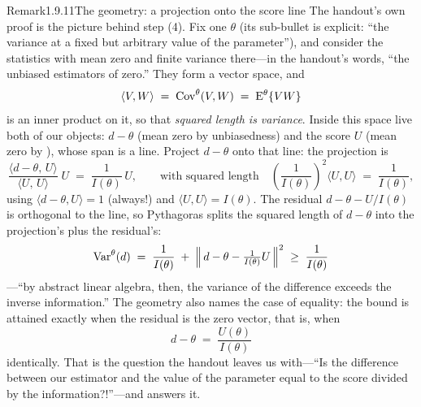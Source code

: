 \documentclass[main.tex]{subfiles}
\begin{document}
\begin{ObjL}{Remark}{1.9.11}{The geometry: a projection onto the score line}
The handout's own proof is the picture behind step (4). Fix one $\theta$ (its sub-bullet is
explicit: ``the variance at a fixed but arbitrary value of the parameter''), and consider the
statistics with mean zero and finite variance there---in the handout's words, ``the unbiased
estimators of zero.'' They form a vector space, and
\[ \langle V, W\rangle \;=\; \operatorname{Cov}^{\theta}(V,W)\;=\;\mathrm{E}^{\theta}\{VW\} \]
is an inner product on it, so that \emph{squared length is variance}. Inside this space live
both of our objects: $d-\theta$ (mean zero by unbiasedness) and the score $U$ (mean zero by
), whose span is a line. Project $d-\theta$ onto that line: the projection is
\[ \frac{\langle d-\theta,\,U\rangle}{\langle U,\,U\rangle}\; U
   \;=\; \frac{1}{I(\theta)}\,U , \qquad\text{with squared length}\quad
   \left(\frac{1}{I(\theta)}\right)^{\!2} \langle U,U\rangle \;=\; \frac{1}{I(\theta)} , \]
using $\langle d-\theta,U\rangle=1$ (always!) and $\langle U,U\rangle=I(\theta)$. The
residual $d-\theta-U/I(\theta)$ is orthogonal to the line, so Pythagoras splits the squared
length of $d-\theta$ into the projection's plus the residual's:
\[ \operatorname{Var}^{\theta}(d) \;=\; \frac{1}{I(\theta)} \;+\;
   \Big\| \,d-\theta-\tfrac{1}{I(\theta)}U\, \Big\|^2 \;\ge\; \frac{1}{I(\theta)} \]
---``by abstract linear algebra, then, the variance of the difference exceeds the inverse
information.'' The geometry also names the case of equality: the bound is attained exactly
when the residual is the zero vector, that is, when
\[ d - \theta \;=\; \frac{U(\theta)}{I(\theta)} \]
identically. That is the question the handout leaves us with---``Is the difference between
our estimator and the value of the parameter equal to the score divided by the
information?!''---and  answers it.
\end{ObjL}
\end{document}
